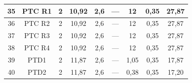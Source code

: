 \documentclass[	DIV=calc,%
							paper=a4,%
							fontsize=12pt,%
							onecolumn]{scrartcl}	 					%
\begin{document}
\begin{tabular}{|c|c|c|c|c|c|c|c|c|}
	35                 & PTC R1             & 2                                                    & 10,92                                       & 2,6                                           & ---                                           & 12                                               & 0,35                                            & 27,87                                                             \\ \hline
	36                 & PTC R2             & 2                                                    & 10,92                                       & 2,6                                           & ---                                           & 12                                               & 0,35                                            & 27,87                                                             \\ \hline
	37                 & PTC R3             & 2                                                    & 10,92                                       & 2,6                                           & ---                                           & 12                                               & 0,35                                            & 27,87                                                             \\ \hline
	38                 & PTC R4             & 2                                                    & 10,92                                       & 2,6                                           & ---                                           & 12                                               & 0,35                                            & 27,87                                                             \\ \hline
	39                 & PTD1               & 2                                                    & 11,87                                       & 2,6                                           & ---                                           & 1,05                                             & 0,35                                            & 17,87                                                             \\ \hline
	40                 & PTD2               & 2                                                    & 11,87                                       & 2,6                                           & ---                                           & 0,38                                             & 0,35                                            & 17,20                                                             \\ \hline

\end{tabular}
\end{document}
